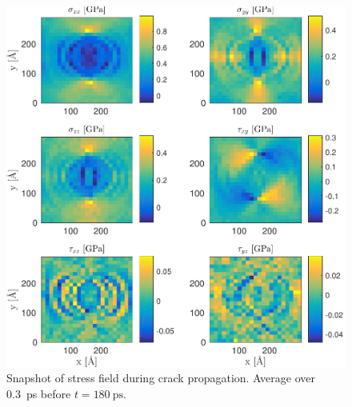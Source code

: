 \begin{figure}
\includegraphics[width=\textwidth]{../figures/thesis/stressfield_snap_propagation_180.pdf}
\caption{Snapshot of stress field during crack propagation. Average over \SI{0.3}{\pico\second} before $t = \SI{180}{\pico\second}$.}
\label{fig:stressfield_snap_propagation_180}
\end{figure}


